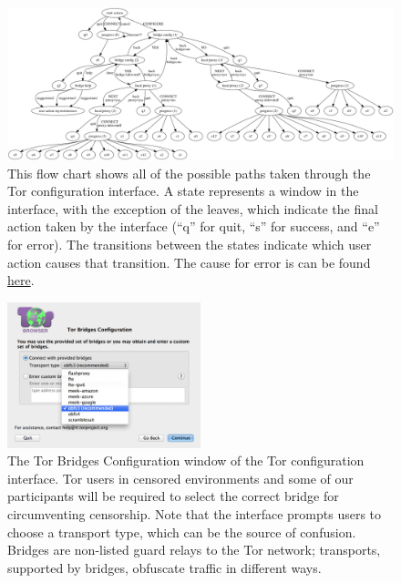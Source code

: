 \documentclass{template}
\begin{document}
\begin{figure}[t]
\label{fig:interface}
  \centering
    \includegraphics[width=\textwidth]{../torconfig.png}
    \caption{This flow chart shows all of the possible paths taken through the
    Tor configuration interface. A state represents a window in the interface,
    with the exception of the leaves, which indicate the final action taken by
    the interface (``q'' for quit, ``s'' for success, and ``e'' for error). The
    transitions between the states indicate which user action causes that
    transition. The cause for error is can be found
\href{https://github.com/lindanlee/circumvention-ux-tor/blob/master/torconfig.dot}{here}.}
\end{figure}

\begin{figure}[t]
\label{fig:bridges}
  \centering
    \includegraphics[width=0.5\textwidth]{configuration-screenshot.png}
    \caption{The Tor Bridges Configuration window of the Tor configuration
    interface. Tor users in censored environments and some of our participants
    will be required to select the correct bridge for circumventing censorship.
    Note that the interface prompts users to choose a transport type, which can be
    the source of confusion. Bridges are non-listed guard relays to the Tor
    network; transports, supported by bridges, obfuscate traffic in
    different ways.}
\end{figure}
\end{document}
